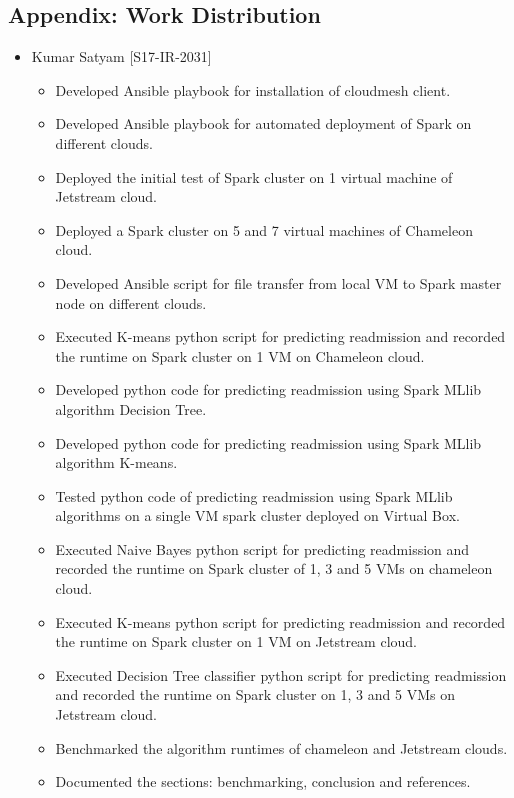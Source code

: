 \documentclass[9pt,twocolumn,twoside]{styles/osajnl}
\begin{document}


\begin{appendices}
\appendix
\section{Appendix: Work Distribution}
\label{appendix:wd}
\begin{itemize}
    \item Kumar Satyam [S17-IR-2031]
    \begin{itemize}
        \item Developed Ansible playbook for installation of cloudmesh client.
        \item Developed Ansible playbook for automated deployment of Spark on different clouds.
        \item Deployed the initial test of Spark cluster on 1 virtual machine of Jetstream cloud.
        \item Deployed a Spark cluster  on 5 and 7 virtual machines of Chameleon cloud.
        \item Developed Ansible script for file transfer from local VM to Spark master node on different clouds.
        \item Executed K-means python script for predicting readmission and recorded the runtime on Spark cluster on 1 VM on Chameleon cloud.
        \item Developed python code for predicting readmission using Spark MLlib algorithm  Decision Tree.
        \item Developed python code for predicting readmission using Spark MLlib algorithm K-means.
        \item Tested python code of predicting readmission using Spark MLlib algorithms on a single VM spark cluster deployed on Virtual Box.
        \item Executed Naive Bayes python script for predicting readmission and recorded the runtime on Spark cluster of 1, 3 and 5 VMs on chameleon cloud.
        \item Executed K-means python script for predicting readmission and recorded the runtime on Spark cluster on 1 VM on Jetstream cloud.
        \item Executed Decision Tree classifier python script for predicting readmission and recorded the runtime on Spark cluster on 1, 3 and 5 VMs on Jetstream cloud.
        \item Benchmarked the algorithm runtimes of chameleon and Jetstream clouds.
        \item Documented the sections: benchmarking, conclusion and references.

\end{itemize}
\end{itemize}
\end{appendices}
\end{document}
